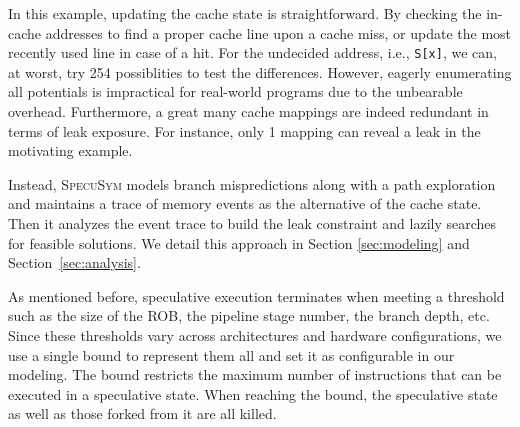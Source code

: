 \documentclass[sigconf]{acmart}
\newcommand\ignore[1]{}
\newcommand{\SpecuSym}{\textsc{SpecuSym} }
\begin{document}
\ignore{
In Figure~\ref{fig:3a}, the speculative state $s'$ inherits the cache 
state from $s$, maps \texttt{v2} into a cache line, and merges back the updated 
cache state to state $s$ before its termination, as formally stated in Algorithm
\ref{alg:specusym} (lines 23-25). 
}


In this example, updating the cache state is straightforward. By checking the 
in-cache addresses to find a proper cache line upon a cache miss, or update the 
most recently used line in case of a hit. For the undecided address, i.e., 
\texttt{S[x]}, we can, at worst, try 254 possiblities to test the differences. 
However, eagerly enumerating all potentials is impractical for real-world programs 
due to the unbearable overhead. Furthermore, a great many cache mappings are
indeed redundant in terms of leak exposure. For instance, only 1 mapping can 
reveal a leak in the motivating example. 




Instead, \SpecuSym models branch mispredictions along with a path exploration
and maintains a trace of memory events as the alternative of the cache state. 
Then it analyzes the event trace to build the leak constraint and lazily 
searches for feasible solutions. We detail this approach in Section
\ref{sec:modeling} and Section~\ref{sec:analysis}. 

As mentioned before, speculative execution terminates when meeting a threshold such as the size of the ROB, the pipeline stage number, the branch depth, etc. Since these thresholds vary across architectures and hardware configurations, we use a single bound to represent them all and set it as configurable in our modeling. The bound restricts the maximum number of instructions that can be executed in a speculative state. When reaching the bound, the speculative state as well as those forked from it are all killed.  
\end{document}
